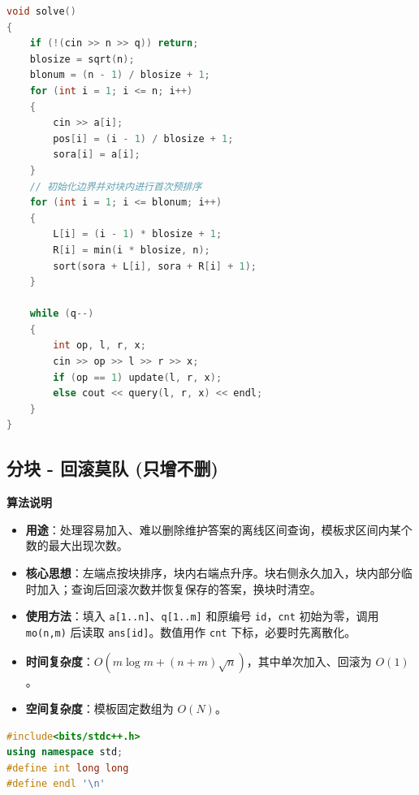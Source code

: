 \documentclass[10pt,landscape,a4paper]{article}
\begin{document}
\begin{multicols*}{3}
\begin{lstlisting}[language=C++]
void solve()
{
    if (!(cin >> n >> q)) return;
    blosize = sqrt(n);
    blonum = (n - 1) / blosize + 1;
    for (int i = 1; i <= n; i++)
    {
        cin >> a[i];
        pos[i] = (i - 1) / blosize + 1;
        sora[i] = a[i];
    }
    // 初始化边界并对块内进行首次预排序
    for (int i = 1; i <= blonum; i++)
    {
        L[i] = (i - 1) * blosize + 1;
        R[i] = min(i * blosize, n);
        sort(sora + L[i], sora + R[i] + 1);
    }

    while (q--)
    {
        int op, l, r, x;
        cin >> op >> l >> r >> x;
        if (op == 1) update(l, r, x);
        else cout << query(l, r, x) << endl;
    }
}
\end{lstlisting}
\subsection*{分块 - 回滚莫队 (只增不删)}
\par\addvspace{0.7ex}\noindent\textbf{算法说明}\par\nobreak
\begin{itemize}
\item \textbf{用途}：处理容易加入、难以删除维护答案的离线区间查询，模板求区间内某个数的最大出现次数。
\item \textbf{核心思想}：左端点按块排序，块内右端点升序。块右侧永久加入，块内部分临时加入；查询后回滚次数并恢复保存的答案，换块时清空。
\item \textbf{使用方法}：填入 \texttt{a\allowbreak{}[\allowbreak{}1\allowbreak{}.\allowbreak{}.\allowbreak{}n\allowbreak{}]}、\texttt{q\allowbreak{}[\allowbreak{}1\allowbreak{}.\allowbreak{}.\allowbreak{}m\allowbreak{}]} 和原编号 \texttt{i\allowbreak{}d}，\texttt{c\allowbreak{}n\allowbreak{}t} 初始为零，调用 \texttt{m\allowbreak{}o\allowbreak{}(\allowbreak{}n\allowbreak{},\allowbreak{}m\allowbreak{})} 后读取 \texttt{a\allowbreak{}n\allowbreak{}s\allowbreak{}[\allowbreak{}i\allowbreak{}d\allowbreak{}]}。数值用作 \texttt{c\allowbreak{}n\allowbreak{}t} 下标，必要时先离散化。
\item \textbf{时间复杂度}：$O(m\log m+(n+m)\sqrt n)$，其中单次加入、回滚为 $O(1)$。
\item \textbf{空间复杂度}：模板固定数组为 $O(N)$。
\end{itemize}
\par{}\par
\begin{lstlisting}[language=C++]
#include<bits/stdc++.h>
using namespace std;
#define int long long
#define endl '\n'


\end{lstlisting}
\end{multicols*}
\end{document}
